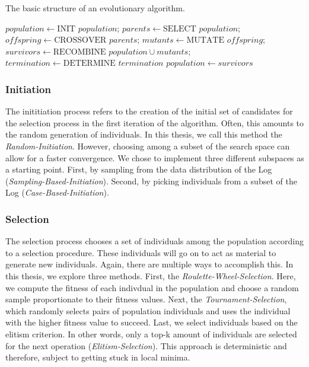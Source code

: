 \documentclass[./../../paper.tex]{subfiles}
\begin{document}
\begin{algorithm}[htb!]
    \caption{The basic structure of an evolutionary algorithm.}
    \begin{algorithmic}
        \State $population \gets \text{INIT } population$;
        \State $parents \gets \text{SELECT } population$;
        \State $offspring \gets \text{CROSSOVER } parents$;
        \State $mutants \gets \text{MUTATE } offspring$;
        \State $survivors \gets \text{RECOMBINE } population \cup mutants$;
        \State $termination \gets \text{DETERMINE } termination$
        \State $population \gets survivors$
        \EndWhile
    \end{algorithmic}
    \label{alg:evolutionary}
\end{algorithm}

\subsubsection{Initiation}
The inititiation process refers to the creation of the initial set of candidates for the selection process in the first iteration of the algorithm. Often, this amounts to the random generation of individuals. In this thesis, we call this method the \emph{Random-Initiation}. However, choosing among a subset of the search space can allow for a faster convergence. We chose to implement three different subspaces as a starting point. First, by sampling from the data distribution of the Log (\emph{Sampling-Based-Initiation}). Second, by picking individuals from a subset of the Log (\emph{Case-Based-Initiation}). 

\subsubsection{Selection}
The selection process chooses a set of individuals among the population according to a selection procedure. These individuals will go on to act as material to generate new individuals. Again, there are multiple ways to accomplish this. In this thesis, we explore three methods. First, the \emph{Roulette-Wheel-Selection}. Here, we compute the fitness of each indivdual in the population and choose a random sample proportionate to their fitness values. Next, the \emph{Tournament-Selection}, which randomly selects pairs of population individuals and uses the individual with the higher fitness value to succeed. Last, we select individuals based on the elitism criterion. In other words, only a top-k amount of individuals are selected for the next operation (\emph{Elitism-Selection}). This approach is deterministic and therefore, subject to getting stuck in local minima.
\end{document}
